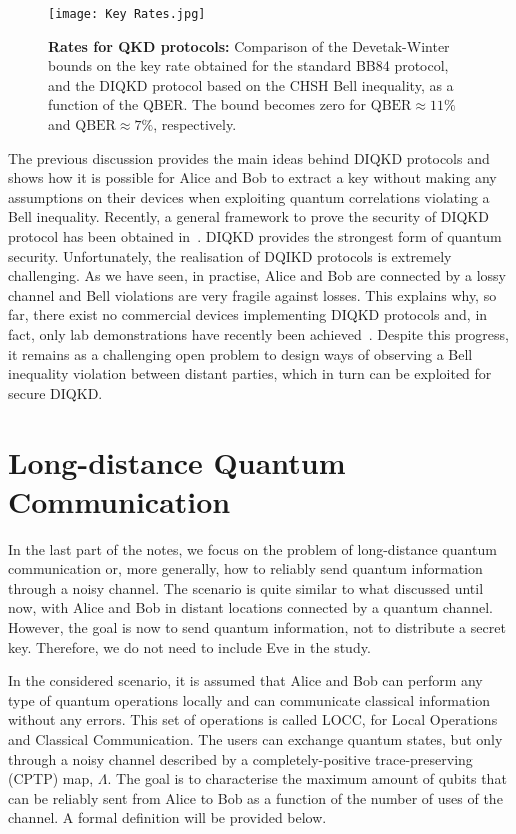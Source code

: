 \documentclass[a4paper]{article}
\begin{document}
\begin{figure}
\begin{center}
  \texttt{[image: Key Rates.jpg]}\\
  \caption{\textbf{Rates for QKD protocols:} Comparison of the Devetak-Winter bounds on the key rate obtained for the standard BB84 protocol, and the DIQKD protocol based on the CHSH Bell inequality, as a function of the QBER. The bound becomes zero for $\text{QBER}\approx 11\%$ and $\text{QBER}\approx 7\%$, respectively.}\label{ratesfig}
\end{center}
\end{figure}


The previous discussion provides the main ideas behind DIQKD protocols and shows how it is possible for Alice and Bob to extract a key without making any assumptions on their devices when exploiting quantum correlations violating a Bell inequality. Recently, a general framework to prove the security of DIQKD protocol has been obtained in~\cite{EAT}. DIQKD provides the strongest form of quantum security. Unfortunately, the realisation of DQIKD protocols is extremely challenging. As we have seen, in practise, Alice and Bob are connected by a lossy channel and Bell violations are very fragile against losses. This explains why, so far, there exist no commercial devices implementing DIQKD protocols and, in fact, only lab demonstrations have recently been achieved~\cite{diexp}. Despite this progress, it remains as a challenging open problem to design ways of observing a Bell inequality violation between distant parties, which in turn can be exploited for secure DIQKD. 


\section{Long-distance Quantum Communication}

In the last part of the notes, we focus on the problem of long-distance quantum communication or, more generally, how to reliably send quantum information through a noisy channel. The scenario is quite similar to what discussed until now, with Alice and Bob in distant locations connected by a quantum channel. However, the goal is now to send quantum information, not to distribute a secret key. Therefore, we do not need to include Eve in the study. 

In the considered scenario, it is assumed that Alice and Bob can perform any type of quantum operations locally and can communicate classical information without any errors. This set of operations is called LOCC, for Local Operations and Classical Communication. The users can exchange quantum states, but only through a noisy channel described by a completely-positive trace-preserving (CPTP) map, $\Lambda$. The goal is to characterise the maximum amount of qubits that can be reliably sent from Alice to Bob as a function of the number of uses of the channel. A formal definition will be provided below.
\end{document}
